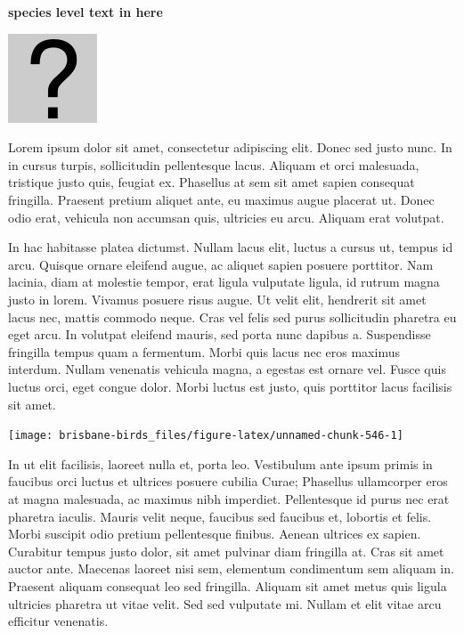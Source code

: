 \documentclass[]{book}
\let\origfigure\figure
\let\endorigfigure\endfigure
\renewenvironment{figure}[1][2] {
  \expandafter\origfigure\expandafter[H]
} {
  \endorigfigure
}
\begin{document}
\textbf{species level text in here}

\begin{figure}
\centering
\includegraphics{assets/missing.png}
\caption{No image for species}
\end{figure}

Lorem ipsum dolor sit amet, consectetur adipiscing elit. Donec sed justo
nunc. In in cursus turpis, sollicitudin pellentesque lacus. Aliquam et
orci malesuada, tristique justo quis, feugiat ex. Phasellus at sem sit
amet sapien consequat fringilla. Praesent pretium aliquet ante, eu
maximus augue placerat ut. Donec odio erat, vehicula non accumsan quis,
ultricies eu arcu. Aliquam erat volutpat.

In hac habitasse platea dictumst. Nullam lacus elit, luctus a cursus ut,
tempus id arcu. Quisque ornare eleifend augue, ac aliquet sapien posuere
porttitor. Nam lacinia, diam at molestie tempor, erat ligula vulputate
ligula, id rutrum magna justo in lorem. Vivamus posuere risus augue. Ut
velit elit, hendrerit sit amet lacus nec, mattis commodo neque. Cras vel
felis sed purus sollicitudin pharetra eu eget arcu. In volutpat eleifend
mauris, sed porta nunc dapibus a. Suspendisse fringilla tempus quam a
fermentum. Morbi quis lacus nec eros maximus interdum. Nullam venenatis
vehicula magna, a egestas est ornare vel. Fusce quis luctus orci, eget
congue dolor. Morbi luctus est justo, quis porttitor lacus facilisis sit
amet.

\begin{figure}
\texttt{[image: brisbane-birds\_files/figure-latex/unnamed-chunk-546-1]} \caption{insert figure caption}\label{fig:unnamed-chunk-546}
\end{figure}

In ut elit facilisis, laoreet nulla et, porta leo. Vestibulum ante ipsum
primis in faucibus orci luctus et ultrices posuere cubilia Curae;
Phasellus ullamcorper eros at magna malesuada, ac maximus nibh
imperdiet. Pellentesque id purus nec erat pharetra iaculis. Mauris velit
neque, faucibus sed faucibus et, lobortis et felis. Morbi suscipit odio
pretium pellentesque finibus. Aenean ultrices ex sapien. Curabitur
tempus justo dolor, sit amet pulvinar diam fringilla at. Cras sit amet
auctor ante. Maecenas laoreet nisi sem, elementum condimentum sem
aliquam in. Praesent aliquam consequat leo sed fringilla. Aliquam sit
amet metus quis ligula ultricies pharetra ut vitae velit. Sed sed
vulputate mi. Nullam et elit vitae arcu efficitur venenatis.
\end{document}
